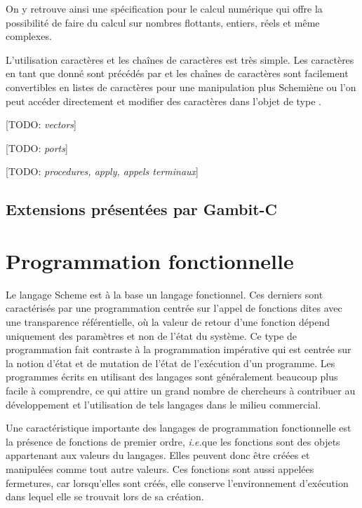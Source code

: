 \documentclass[12pt,oneside,letterpaper,francais]{book}
\newcommand{\todo}[1]{[TODO: {\it #1}]}
\newcommand{\ie}{{\textit{i.e.}}}
\newcommand{\scheme}[1]{\selectlanguage{english}{\tt #1}\selectlanguage{french}}
\begin{document}
On y retrouve ainsi une spécification pour le calcul numérique qui
offre la possibilité de faire du calcul sur nombres flottants,
entiers, réels et même complexes. 

L'utilisation caractères et les chaînes de caractères est très
simple. Les caractères en tant que donné sont précédés par
\scheme{\#\textbackslash} et les chaînes de caractères sont facilement
convertibles en listes de caractères pour une manipulation plus \og
Schemiène \fg ou l'on peut accéder directement et modifier des
caractères dans l'objet de type \scheme{string}.

\todo{vectors}

\todo{ports}

\todo{procedures, apply, appels terminaux}

\subsection{Extensions présentées par Gambit-C}

\section{Programmation fonctionnelle}
Le langage Scheme est à la base un langage fonctionnel. Ces derniers
sont caractérisés par une programmation centrée sur l'appel de
fonctions dites avec une transparence référentielle, où la valeur de
retour d'une fonction dépend uniquement des paramètres et non de
l'état du système. Ce type de programmation fait contraste à la
programmation impérative qui est centrée sur la notion d'état et de
mutation de l'état de l'exécution d'un programme. Les programmes
écrits en utilisant des langages sont généralement beaucoup plus
facile à comprendre, ce qui attire un grand nombre de chercheurs à
contribuer au développement et l'utilisation de tels langages dans le
milieu commercial. 

Une caractéristique importante des langages de programmation
fonctionnelle est la présence de fonctions de premier ordre, \ie que
les fonctions sont des objets appartenant aux valeurs du
langages. Elles peuvent donc être créées et manipulées comme tout
autre valeurs. Ces fonctions sont aussi appelées fermetures, car
lorsqu'elles sont créés, elle conserve l'environnement d'exécution
dans lequel elle se trouvait lors de sa création. 
\end{document}

